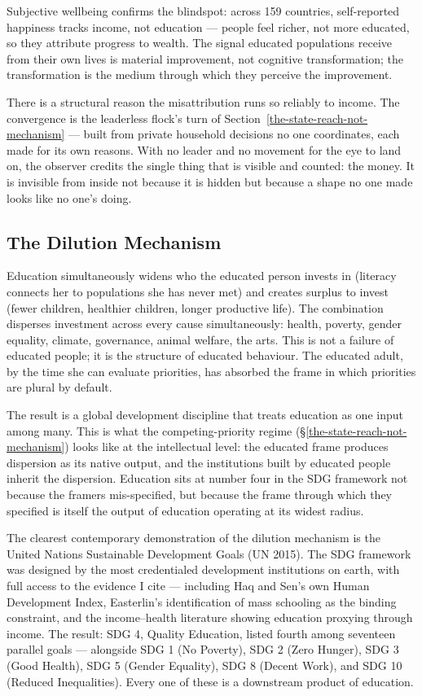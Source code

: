 \documentclass[12pt,letterpaper]{article}
\begin{document}
Subjective wellbeing confirms the blindspot: across 159 countries,
self-reported happiness tracks income, not education --- people feel
richer, not more educated, so they attribute progress to
wealth. The signal
educated populations receive from their own lives is material
improvement, not cognitive transformation; the transformation is the
medium through which they perceive the improvement.

There is a structural reason the misattribution runs so reliably to
income. The convergence is the leaderless flock's turn of
Section~\ref{the-state-reach-not-mechanism} --- built from private
household decisions no one coordinates, each made for its own reasons.
With no leader and no movement for the eye to land on, the observer
credits the single thing that is visible and counted: the money. It is
invisible from inside not because it is hidden but because a shape no
one made looks like no one's doing.

\subsection{The Dilution Mechanism}\label{the-dilution-mechanism}

Education simultaneously widens who the educated person invests in
(literacy connects her to populations she has never met) and creates
surplus to invest (fewer children, healthier children, longer
productive life). The combination disperses investment across every
cause simultaneously: health, poverty, gender equality, climate,
governance, animal welfare, the arts. This is not a failure of
educated people; it is the structure of educated behaviour. The
educated adult, by the time she can evaluate priorities, has absorbed
the frame in which priorities are plural by default.

The result is a global development discipline that treats education
as one input among many. This is what the competing-priority regime
(\S\ref{the-state-reach-not-mechanism})
looks like at the intellectual level: the educated frame produces
dispersion as its native output, and the institutions built by
educated people inherit the dispersion. Education sits at number
four in the SDG framework not because the framers mis-specified, but
because the frame through which they specified is itself the output
of education operating at its widest radius.

The clearest contemporary demonstration of the dilution mechanism is
the United Nations Sustainable Development Goals (UN 2015). The SDG
framework was designed by the most credentialed development
institutions on earth, with full access to the evidence I
cite --- including Haq and Sen's own Human Development Index,
Easterlin's identification of mass schooling as the binding
constraint, and the income--health literature showing education
proxying through income. The result: SDG 4, Quality Education, listed
fourth among seventeen parallel goals --- alongside SDG 1 (No
Poverty), SDG 2 (Zero Hunger), SDG 3 (Good Health), SDG 5 (Gender
Equality), SDG 8 (Decent Work), and SDG 10 (Reduced Inequalities).
Every one of these is a downstream product of education.
\end{document}
